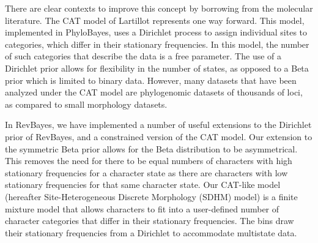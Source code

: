 \documentclass[]{article}
\begin{document}
There are clear contexts to improve this concept by borrowing from the molecular literature.
The CAT model of Lartillot represents one way forward. 
This model, implemented in PhyloBayes, uses a Dirichlet process to assign individual sites to categories, which differ in their stationary frequencies. 
In this model, the number of such categories that describe the data is a free parameter. 
The use of a Dirichlet prior allows for flexibility in the number of states, as opposed to a Beta prior which is limited to binary data.
However, many datasets that have been analyzed under the CAT model are phylogenomic datasets of thousands of loci, as compared to small morphology datasets.\par
In RevBayes, we have implemented a number of useful extensions to the Dirichlet prior of RevBayes, and a constrained version of the CAT model. 
Our extension to the symmetric Beta prior allows for the Beta distribution to be asymmetrical.
This removes the need for there to be equal numbers of characters with high stationary frequencies for a character state as there are characters with low stationary frequencies for that same character state.
Our CAT-like model (hereafter Site-Heterogeneous Discrete Morphology (SDHM) model) is a finite mixture model that allows characters to fit into a user-defined number of character categories that differ in their stationary frequencies. 
The bins draw their stationary frequencies from a Dirichlet to accommodate multistate data. 
\end{document}
